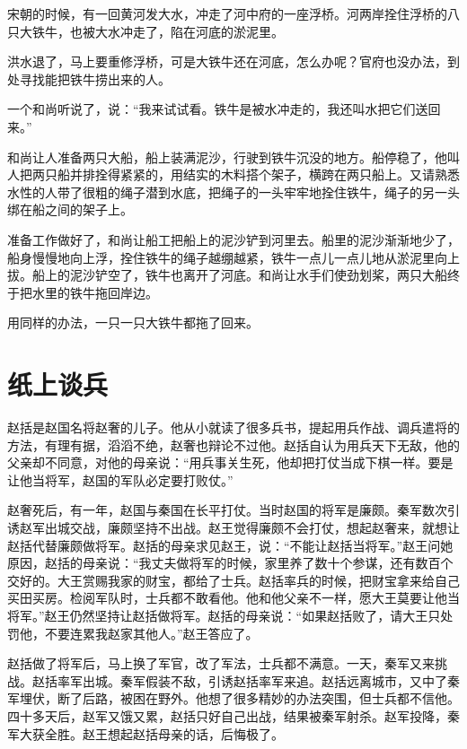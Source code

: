 \documentclass[12pt,UTF-8,openany]{ctexbook}
\begin{document}
\begin{Large}
    
    宋朝的时候，有一回黄河发大水，冲走了河中府的一座浮桥。河两岸拴住浮桥的八只大铁牛，也被大水冲走了，陷在河底的淤泥里。
    
    洪水退了，马上要重修浮桥，可是大铁牛还在河底，怎么办呢？官府也没办法，到处寻找能把铁牛捞出来的人。
    
    一个和尚听说了，说：“我来试试看。铁牛是被水冲走的，我还叫水把它们送回来。”
    
    和尚让人准备两只大船，船上装满泥沙，行驶到铁牛沉没的地方。船停稳了，他叫人把两只船并排拴得紧紧的，用结实的木料搭个架子，横跨在两只船上。又请熟悉水性的人带了很粗的绳子潜到水底，把绳子的一头牢牢地拴住铁牛，绳子的另一头绑在船之间的架子上。
    
    准备工作做好了，和尚让船工把船上的泥沙铲到河里去。船里的泥沙渐渐地少了，船身慢慢地向上浮，拴住铁牛的绳子越绷越紧，铁牛一点儿一点儿地从淤泥里向上拔。船上的泥沙铲空了，铁牛也离开了河底。和尚让水手们使劲划桨，两只大船终于把水里的铁牛拖回岸边。
    
    用同样的办法，一只一只大铁牛都拖了回来。
    
\end{Large}

\chapter{纸上谈兵}

\begin{Large}
    
    赵括是赵国名将赵奢的儿子。他从小就读了很多兵书，提起用兵作战、调兵遣将的方法，有理有据，滔滔不绝，赵奢也辩论不过他。赵括自认为用兵天下无敌，他的父亲却不同意，对他的母亲说：“用兵事关生死，他却把打仗当成下棋一样。要是让他当将军，赵国的军队必定要打败仗。”
    
    赵奢死后，有一年，赵国与秦国在长平打仗。当时赵国的将军是廉颇。秦军数次引诱赵军出城交战，廉颇坚持不出战。赵王觉得廉颇不会打仗，想起赵奢来，就想让赵括代替廉颇做将军。赵括的母亲求见赵王，说：“不能让赵括当将军。”赵王问她原因，赵括的母亲说：“我丈夫做将军的时候，家里养了数十个参谋，还有数百个交好的。大王赏赐我家的财宝，都给了士兵。赵括率兵的时候，把财宝拿来给自己买田买房。检阅军队时，士兵都不敢看他。他和他父亲不一样，愿大王莫要让他当将军。”赵王仍然坚持让赵括做将军。赵括的母亲说：“如果赵括败了，请大王只处罚他，不要连累我赵家其他人。”赵王答应了。
    
    赵括做了将军后，马上换了军官，改了军法，士兵都不满意。一天，秦军又来挑战。赵括率军出城。秦军假装不敌，引诱赵括率军来追。赵括远离城市，又中了秦军埋伏，断了后路，被困在野外。他想了很多精妙的办法突围，但士兵都不信他。四十多天后，赵军又饿又累，赵括只好自己出战，结果被秦军射杀。赵军投降，秦军大获全胜。赵王想起赵括母亲的话，后悔极了。
    
\end{Large}
\end{document}
